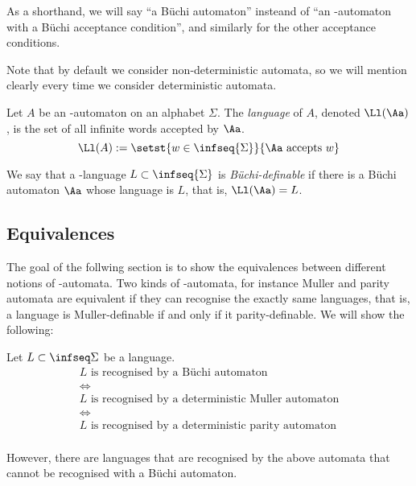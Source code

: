 \begin{remark}
    As a shorthand, we will say ``a Büchi automaton''
    insteand of ``an \w-automaton with a Büchi acceptance condition'',
    and similarly for the other acceptance conditions.

    Note that by default we consider non-deterministic automata,
    so we will mention clearly every time we consider deterministic
    automata.
\end{remark}


\begin{definition}
    Let $A$ be an \w-automaton on an alphabet $\Sigma$.
    The \emph{language} of $A$, denoted $\Ll(\Aa)$,
    is the set of all infinite words accepted by $\Aa$.
    \[
        \Ll(A) := \setst{w \in \infseq{\Sigma}}{\Aa \text{ accepts } w}
    \]

    We say that a \w-language $L \subset \infseq{\Sigma}$ is
    \emph{Büchi-definable} if there is a Büchi automaton $\Aa$
    whose language is $L$,  that is, $\Ll(\Aa) = L$.
\end{definition}

\subsection{Equivalences}
The goal of the follwing section is to show the equivalences
between different notions of \w-automata.
Two kinds of \w-automata, for instance Muller and parity automata
are equivalent if they can recognise the exactly same languages,
that is, a language is Muller-definable if and only if it parity-definable.
We will show the following:

\begin{theorem}
    \label{thm:all-automata-are-the-same}
    Let $L \subset \infseq\Sigma$ be a language.
    \[
        \begin{array}{c}
        L \text{ is recognised by a Büchi automaton} \\
        \iff \\
        L \text{ is recognised by a deterministic Muller automaton} \\
        \iff \\
        L \text{ is recognised by a deterministic parity automaton} \\
        \end{array}
    \]

    However, there are languages that are recognised by the above
    automata that cannot be recognised with a Büchi automaton.
\end{theorem}

